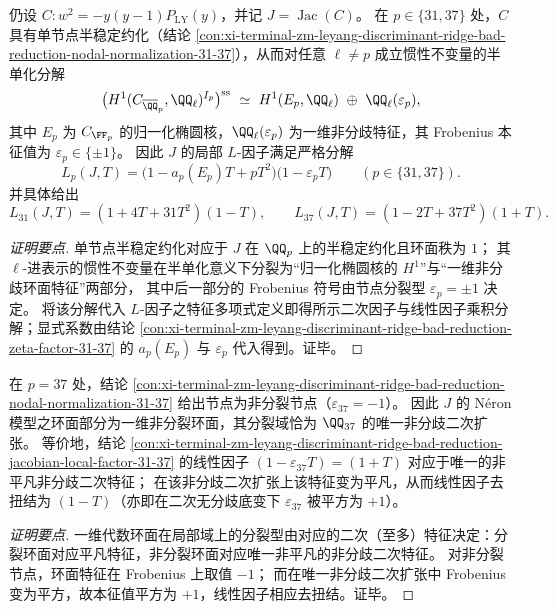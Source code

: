 \begin{conclusion}\label{con:xi-terminal-zm-leyang-discriminant-ridge-bad-reduction-jacobian-local-factor-31-37}
仍设 \(C:w^{2}=-y(y-1)P_{\mathrm{LY}}(y)\)，并记 \(J=\operatorname{Jac}(C)\)。
在 \(p\in\{31,37\}\) 处，\(C\) 具有单节点半稳定约化（结论 \ref{con:xi-terminal-zm-leyang-discriminant-ridge-bad-reduction-nodal-normalization-31-37}），从而对任意 \(\ell\neq p\) 成立惯性不变量的半单化分解
\[
\bigl(H^{1}(C_{\overline{\QQ}_{p}},\QQ_{\ell})^{I_{p}}\bigr)^{\mathrm{ss}}
\ \simeq\
H^{1}(E_{p},\QQ_{\ell})\ \oplus\ \QQ_{\ell}(\varepsilon_{p}),
\]
其中 \(E_p\) 为 \(C_{\FF_p}\) 的归一化椭圆核，\(\QQ_{\ell}(\varepsilon_{p})\) 为一维非分歧特征，其 Frobenius 本征值为 \(\varepsilon_p\in\{\pm 1\}\)。
因此 \(J\) 的局部 \(L\)-因子满足严格分解
\[
\boxed{\ L_{p}(J,T)=\bigl(1-a_{p}(E_{p})T+pT^{2}\bigr)\bigl(1-\varepsilon_{p}T\bigr)\qquad(p\in\{31,37\}).\ }
\]
并具体给出
\[
L_{31}(J,T)=(1+4T+31T^{2})(1-T),\qquad
L_{37}(J,T)=(1-2T+37T^{2})(1+T).
\]
\end{conclusion}
\begin{proof}[证明要点]
单节点半稳定约化对应于 \(J\) 在 \(\QQ_p\) 上的半稳定约化且环面秩为 \(1\)；
其 \(\ell\)-进表示的惯性不变量在半单化意义下分裂为“归一化椭圆核的 \(H^{1}\)”与“一维非分歧环面特征”两部分，
其中后一部分的 Frobenius 符号由节点分裂型 \(\varepsilon_p=\pm 1\) 决定。
将该分解代入 \(L\)-因子之特征多项式定义即得所示二次因子与线性因子乘积分解；显式系数由结论 \ref{con:xi-terminal-zm-leyang-discriminant-ridge-bad-reduction-zeta-factor-31-37} 的 \(a_p(E_p)\) 与 \(\varepsilon_p\) 代入得到。证毕。
\end{proof}

\begin{conclusion}[\texorpdfstring{$p=37$}{p=37} 处非分裂节点的最小分裂域：唯一非分歧二次扩张与线性因子去扭结]\label{con:xi-terminal-zm-leyang-discriminant-ridge-bad-reduction-37-minimal-splitting-field}
在 \(p=37\) 处，结论 \ref{con:xi-terminal-zm-leyang-discriminant-ridge-bad-reduction-nodal-normalization-31-37} 给出节点为非分裂节点（\(\varepsilon_{37}=-1\)）。
因此 \(J\) 的 N\'eron 模型之环面部分为一维非分裂环面，其分裂域恰为 \(\QQ_{37}\) 的唯一非分歧二次扩张。
等价地，结论 \ref{con:xi-terminal-zm-leyang-discriminant-ridge-bad-reduction-jacobian-local-factor-31-37} 的线性因子 \((1-\varepsilon_{37}T)=(1+T)\) 对应于唯一的非平凡非分歧二次特征；
在该非分歧二次扩张上该特征变为平凡，从而线性因子去扭结为 \((1-T)\)（亦即在二次无分歧底变下 \(\varepsilon_{37}\) 被平方为 \(+1\)）。
\end{conclusion}
\begin{proof}[证明要点]
一维代数环面在局部域上的分裂型由对应的二次（至多）特征决定：分裂环面对应平凡特征，非分裂环面对应唯一非平凡的非分歧二次特征。
对非分裂节点，环面特征在 Frobenius 上取值 \(-1\)；
而在唯一非分歧二次扩张中 Frobenius 变为平方，故本征值平方为 \(+1\)，线性因子相应去扭结。证毕。
\end{proof}

